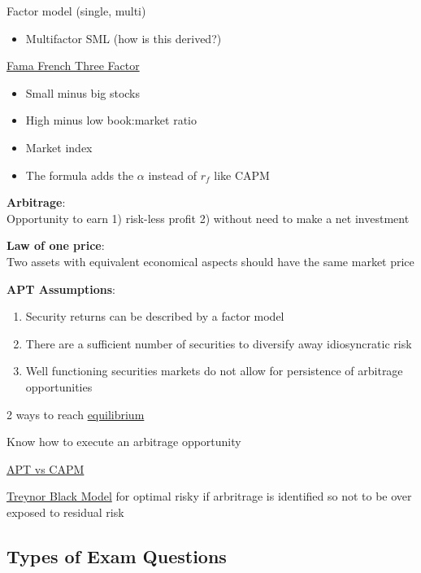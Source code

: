 \documentclass[]{book}
\providecommand{\tightlist}{%
  \setlength{\itemsep}{0pt}\setlength{\parskip}{0pt}}
\theoremstyle{definition}
\theoremstyle{definition}
\theoremstyle{remark}
\begin{document}
Factor model (single, multi)

\begin{itemize}
\tightlist
\item
  Multifactor SML (how is this derived?)
\end{itemize}

\protect\hyperlink{famma}{Fama French Three Factor}

\begin{itemize}
\tightlist
\item
  Small minus big stocks
\item
  High minus low book:market ratio
\item
  Market index
\item
  The formula adds the \(\alpha\) instead of \(r_f\) like CAPM
\end{itemize}

\textbf{Arbitrage}:\\
Opportunity to earn 1) risk-less profit 2) without need to make a net
investment

\textbf{Law of one price}:\\
Two assets with equivalent economical aspects should have the same
market price

\textbf{APT Assumptions}:

\begin{enumerate}
\def\labelenumi{\arabic{enumi})}
\item
  Security returns can be described by a factor model
\item
  There are a sufficient number of securities to diversify away
  idiosyncratic risk
\item
  Well functioning securities markets do not allow for persistence of
  arbitrage opportunities
\end{enumerate}

2 ways to reach \protect\hyperlink{equil}{equilibrium}

Know how to execute an arbitrage opportunity

\protect\hyperlink{APT-v-CAPM}{APT vs CAPM}

\protect\hyperlink{TB}{Treynor Black Model} for optimal risky if
arbritrage is identified so not to be over exposed to residual risk

\subsection{Types of Exam Questions}\label{types-of-exam-questions-4}
\end{document}
